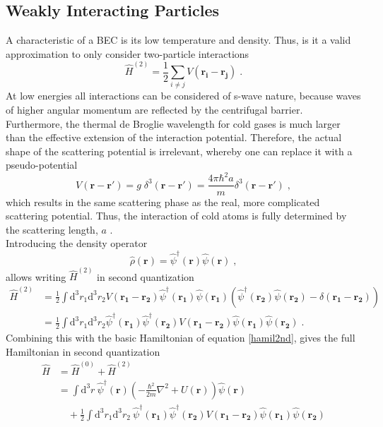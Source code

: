 \subsection{Weakly Interacting Particles}
A characteristic of a BEC is its low temperature and density. Thus, is it a valid approximation to only consider two-particle interactions
\begin{equation}
	\hat{H}^{(2)} = \frac{1}{2} \sum_{i \neq j} V(\boldsymbol{r_i} - \boldsymbol{r_j}) \; .
\end{equation}
At low energies all interactions can be considered of s-wave nature, because waves of higher angular momentum are reflected by the centrifugal barrier. Furthermore, the thermal de Broglie wavelength for cold gases is much larger than the effective extension of the interaction potential. Therefore, the actual shape of the scattering potential is irrelevant, whereby one can replace it with a pseudo-potential
\begin{equation}
	V(\boldsymbol{r} - \boldsymbol{r'}) = g \; \delta^3(\boldsymbol{r} - \boldsymbol{r'}) = \frac{4 \pi \hbar^2 a}{m} \delta^3(\boldsymbol{r} - \boldsymbol{r'}) \; ,
\end{equation}
which results in the same scattering phase as the real, more complicated scattering potential. Thus, the interaction of cold atoms is fully determined by the scattering length, $a$ \cite{greiner}.\\
Introducing the density operator
\begin{equation}
	\hat{\rho}(\boldsymbol{r}) = \hat{\psi}^{\dag}(\boldsymbol{r}) \hat{\psi}(\boldsymbol{r}) \; ,
\end{equation}
allows writing $\hat{H}^{(2)}$ in second quantization
\begin{align}
	\hat{H}^{(2)} &= \frac{1}{2} \int \mathrm{d^3}r_1 \mathrm{d^3}r_2 V(\boldsymbol{r_1} - \boldsymbol{r_2}) \hat{\psi}^{\dag}(\boldsymbol{r_1}) \hat{\psi}(\boldsymbol{r_1}) \left( \hat{\psi}^{\dag}(\boldsymbol{r_2}) \hat{\psi}(\boldsymbol{r_2}) - \delta(\boldsymbol{r_1} - \boldsymbol{r_2}) \right) \nonumber \\
	&= \frac{1}{2} \int \mathrm{d^3}r_1 \mathrm{d^3}r_2  \hat{\psi}^{\dag}(\boldsymbol{r_1}) \hat{\psi}^{\dag}(\boldsymbol{r_2}) V(\boldsymbol{r_1} - \boldsymbol{r_2}) \hat{\psi}(\boldsymbol{r_1}) \hat{\psi}(\boldsymbol{r_2}) \; .
\end{align}
Combining this with the basic Hamiltonian of equation \eqref{hamil2nd}, gives the full Hamiltonian in second quantization
\begin{align}
	\hat{H} &= \hat{H}^{(0)} + \hat{H}^{(2)} \\
	& = \int \mathrm{d^3}r \ \hat{\psi}^{\dag}(\boldsymbol{r}) \left( - \frac{\hbar^2}{2 m} \nabla^2 + U(\boldsymbol{r})\right) \hat{\psi}(\boldsymbol{r}) \nonumber \\
	 & \quad + \frac{1}{2} \int \mathrm{d^3}r_1 \mathrm{d^3}r_2  \ \hat{\psi}^{\dag}(\boldsymbol{r_1}) \hat{\psi}^{\dag}(\boldsymbol{r_2}) V(\boldsymbol{r_1} - \boldsymbol{r_2}) \hat{\psi}(\boldsymbol{r_1}) \hat{\psi}(\boldsymbol{r_2})
	\label{hamilint}
\end{align}
